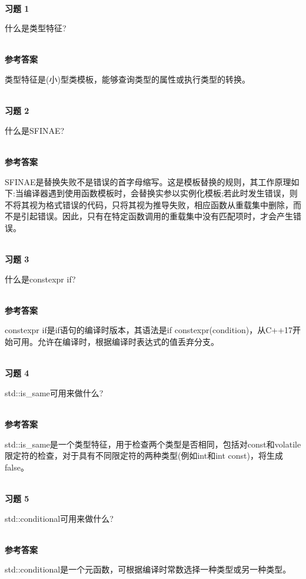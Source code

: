 \hspace*{\fill} \\ %
\noindent
\textbf{习题 1}

什么是类型特征?

\hspace*{\fill} \\ %
\noindent
\textbf{参考答案}

类型特征是(小)型类模板，能够查询类型的属性或执行类型的转换。


\hspace*{\fill} \\ %
\noindent
\textbf{习题 2}

什么是SFINAE?

\hspace*{\fill} \\ %
\noindent
\textbf{参考答案}

SFINAE是替换失败不是错误的首字母缩写。这是模板替换的规则，其工作原理如下:当编译器遇到使用函数模板时，会替换实参以实例化模板;若此时发生错误，则不将其视为格式错误的代码，只将其视为推导失败，相应函数从重载集中删除，而不是引起错误。因此，只有在特定函数调用的重载集中没有匹配项时，才会产生错误。

\hspace*{\fill} \\ %
\noindent
\textbf{习题 3}

什么是constexpr if?

\hspace*{\fill} \\ %
\noindent
\textbf{参考答案}

constexpr if是if语句的编译时版本，其语法是if constexpr(condition)，从C++17开始可用。允许在编译时，根据编译时表达式的值丢弃分支。

\hspace*{\fill} \\ %
\noindent
\textbf{习题 4}

std::is\_same可用来做什么?

\hspace*{\fill} \\ %
\noindent
\textbf{参考答案}

std::is\_same是一个类型特征，用于检查两个类型是否相同，包括对const和volatile限定符的检查，对于具有不同限定符的两种类型(例如int和int const)，将生成false。

\hspace*{\fill} \\ %
\noindent
\textbf{习题 5}

std::conditional可用来做什么?

\hspace*{\fill} \\ %
\noindent
\textbf{参考答案}

std::conditional是一个元函数，可根据编译时常数选择一种类型或另一种类型。












